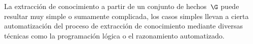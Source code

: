 \documentclass[11pt,letterpaper]{article}
\begin{document}
La extracci\'on de conocimiento a partir de un conjunto de hechos~$\G$ puede
resultar muy simple o sumamente complicada, los casos simples llevan a
cierta automatizaci\'on del proceso de extracci\'on de conocimiento
mediante diversas t\'ecnicas como la programaci\'on l\'ogica o el
razonamiento automatizado. 


\end{document}
